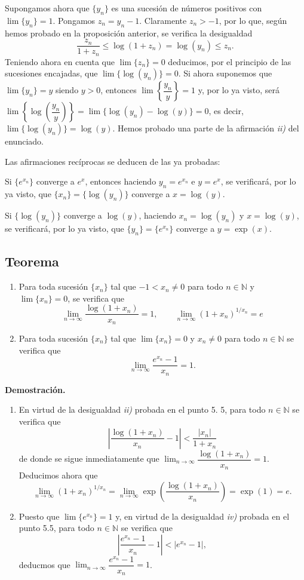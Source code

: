 \documentclass[10pt,a4paper]{article}
\begin{document}
	Supongamos ahora que $\{y_n\}$ es una sucesión de números positivos con $\lim\{y_n\} = 1$. Pongamos $z_n = y_n - 1$. Claramente $z_n > -1$, por lo que, según hemos probado en la proposición anterior, se verifica la desigualdad $$ \dfrac{z_n}{1+z_n} \leq \log(1+z_n) = \log(y_n) \leq z_n.$$
	Teniendo ahora en cuenta que $\lim\{z_n\} = 0$ deducimos, por el principio de las sucesiones encajadas, que $\lim\{\log(y_n)\} = 0$. Si ahora suponemos que $\lim\{y_n\} = y$ siendo $y > 0$, entonces $\lim\left\{\dfrac{y_n}{y}\right\} = 1$ y, por lo ya visto, será $\lim\left\{\log(\dfrac{y_n}{y})\right\} = \lim\{\log(y_n) - \log(y)\} = 0$, es decir, $\lim\{\log(y_n)\} = \log(y)$. Hemos probado una parte de la afirmación \textit{ii)} del enunciado.
	
	Las afirmaciones recíprocas se deducen de las ya probadas:
	
	\qquad Si $\{e^{x_n}\}$ converge a $e^x$, entonces haciendo $y_n = e^{x_n}$ e $y = e^x$, se verificará, por lo ya visto, que $\{x_n\} = \{\log(y_n)\}$ converge a $x = \log(y)$.
	
	\qquad Si $\{\log(y_n)\}$ converge a $\log(y)$, haciendo $x_n = \log(y_n)$ y $x = \log(y)$, se verificará, por lo ya visto, que $\{y_n\} = \{e^{x_n}\}$ converge a $y = \exp(x)$.	
	
	\subsection{Teorema}
	
	\begin{enumerate}[label=\roman*]
		\item Para toda sucesión $\{x_n\}$ tal que $-1 < x_n \neq 0$ para todo $n \in \mathbb{N}$ y $\lim\{x_n\} = 0$, se verifica que $$\lim_{n \rightarrow \infty}\dfrac{\log(1+x_n)}{x_n} = 1, \qquad \lim_{n \rightarrow \infty}(1+x_n)^{1/x_n} = e$$
		\item Para toda sucesión $\{x_n\}$ tal que $\lim\{x_n\} = 0$ y $x_n \neq 0$ para todo $n \in \mathbb{N}$ se verifica que $$\lim_{n \rightarrow \infty}\dfrac{e^{x_n}-1}{x_n} = 1.$$
	\end{enumerate}

	\textbf{Demostración. }
	\begin{enumerate}[label=\roman*]
		\item En virtud de la desigualdad \textit{ii)} probada en el punto 5. 5, para todo $n \in \mathbb{N}$ se verifica que 
		$$\left|\dfrac{\log(1+x_n)}{x_n}-1 \right| < \dfrac{|x_n|}{1+x_n}$$
		de donde se sigue inmediatamente que $\displaystyle\lim_{n \rightarrow \infty}\dfrac{\log(1+x_n)}{x_n} = 1$. Deducimos ahora que $$\lim_{n \rightarrow \infty}(1+x_n) ^{1/x_n} = \lim_{n \rightarrow \infty}\exp\left(\dfrac{\log(1+x_n)}{x_n}\right) = \exp(1) = e.$$
		\item Puesto que $\lim\{e^{x_n}\} = 1$ y, en virtud de la desigualdad \textit{iv)} probada en el punto 5.5, para todo $n \in \mathbb{N}$ se verifica que 
		$$\left|\dfrac{e^{x_n}-1}{x_n} - 1\right| < |e^{x_n}-1|,$$
		deducmos que $\displaystyle\lim_{n \rightarrow \infty}\dfrac{e^{x_n}-1}{x_n} = 1$.
	\end{enumerate}
	
\end{document}
